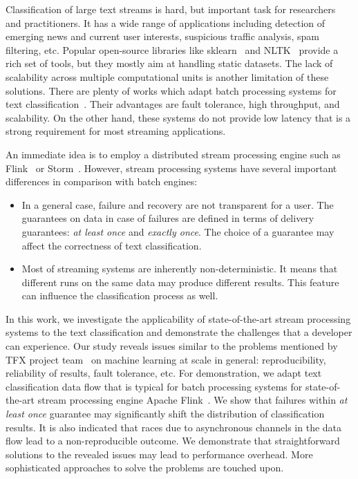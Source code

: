 \label {fs-short-intro}

Classification of large text streams is hard, but important task for researchers and practitioners. It has a wide range of applications including detection of emerging news and current user interests, suspicious traffic analysis, spam filtering, etc. Popular open-source libraries like sklearn~\cite{sklearn_api} and NLTK~\cite{bird2009natural} provide a rich set of tools, but they mostly aim at handling static datasets. The lack of scalability across multiple computational units is another limitation of these solutions. There are plenty of works which adapt batch processing systems for text classification~\cite{semberecki2016distributed, svyatkovskiy2016large, baltas2016apache}. Their advantages are fault tolerance, high throughput, and scalability. On the other hand, these systems do not provide low latency that is a strong requirement for most streaming applications.

An immediate idea is to employ a distributed stream processing engine such as Flink~\cite{Carbone:2017:SMA:3137765.3137777} or Storm~\cite{apache:storm}. However, stream processing systems have several important differences in comparison with batch engines: 

\begin{itemize}
    \item In a general case, failure and recovery are not transparent for a user. The guarantees on data in case of failures are defined in terms of delivery guarantees: {\em at least once} and {\em exactly once}. The choice of a guarantee may affect the correctness of text classification.
    \item Most of streaming systems are inherently non-deterministic. It means that different runs on the same data may produce different results. This feature can influence the classification process as well.
\end{itemize}

In this work, we investigate the applicability of state-of-the-art stream processing systems to the text classification and demonstrate the challenges that a developer can experience. Our study reveals issues similar to the problems mentioned by TFX project team~\cite{Baylor:2017:TTP:3097983.3098021} on machine learning at scale in general: reproducibility, reliability of results, fault tolerance, etc. For demonstration, we adapt text classification data flow that is typical for batch processing systems for state-of-the-art stream processing engine Apache Flink~\cite{Carbone:2017:SMA:3137765.3137777}. We show that failures within {\em at least once} guarantee may significantly shift the distribution of classification results. It is also indicated that races due to asynchronous channels in the data flow lead to a non-reproducible outcome. We demonstrate that straightforward solutions to the revealed issues may lead to performance overhead. More sophisticated approaches to solve the problems are touched upon.

